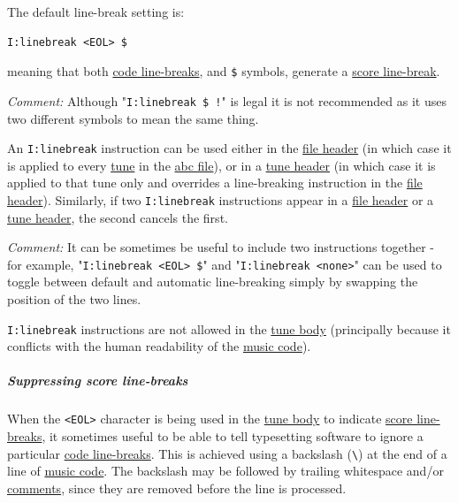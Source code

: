 \documentclass[oneside]{book}
\let\oldsubparagraph\subparagraph
\renewcommand{\subparagraph}[1]{\oldsubparagraph{#1}\mbox{}}
\begin{document}
The default line-break setting is:

\begin{verbatim}
I:linebreak <EOL> $
\end{verbatim}

meaning that both \protect\hyperlink{code_line-break_definition}{code
line-breaks}, and \texttt{\$} symbols, generate a
\protect\hyperlink{score_line-break_definition}{score line-break}.

\emph{Comment:} Although "\texttt{I:linebreak\ \$\ !}" is legal it is
not recommended as it uses two different symbols to mean the same thing.

An \texttt{I:linebreak} instruction can be used either in the
\protect\hyperlink{file_header_definition}{file header} (in which case
it is applied to every \protect\hyperlink{abc_tune_definition}{tune} in
the \protect\hyperlink{abc_file_definition}{abc file}), or in a
\protect\hyperlink{tune_header_definition}{tune header} (in which case
it is applied to that tune only and overrides a line-breaking
instruction in the \protect\hyperlink{file_header_definition}{file
header}). Similarly, if two \texttt{I:linebreak} instructions appear in
a \protect\hyperlink{file_header_definition}{file header} or a
\protect\hyperlink{tune_header_definition}{tune header}, the second
cancels the first.

\emph{Comment:} It can be sometimes be useful to include two
instructions together - for example,
"\texttt{I:linebreak\ \textless{}EOL\textgreater{}\ \$}" and
"\texttt{I:linebreak\ \textless{}none\textgreater{}}" can be used to
toggle between default and automatic line-breaking simply by swapping
the position of the two lines.

\texttt{I:linebreak} instructions are not allowed in the
\protect\hyperlink{tune_body_definition}{tune body} (principally because
it conflicts with the human readability of the
\protect\hyperlink{music_code_definition}{music code}).

\subparagraph{Suppressing score
line-breaks}\label{suppressing_score_line-breaks}

When the \texttt{\textless{}EOL\textgreater{}} character is being used
in the \protect\hyperlink{tune_body_definition}{tune body} to indicate
\protect\hyperlink{score_line-break_definition}{score line-breaks}, it
sometimes useful to be able to tell typesetting software to ignore a
particular \protect\hyperlink{code_line-break_definition}{code
line-breaks}. This is achieved using a backslash
(\texttt{\textbackslash{}}) at the end of a line of
\protect\hyperlink{music_code_definition}{music code}. The backslash may
be followed by trailing whitespace and/or
\protect\hyperlink{comment_definition}{comments}, since they are removed
before the line is processed.
\end{document}
